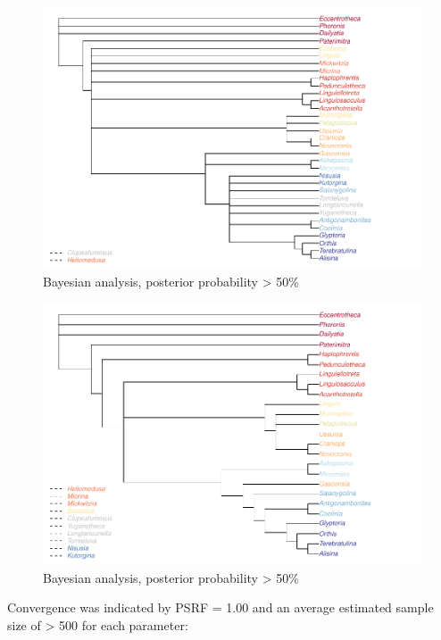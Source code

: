 \documentclass[]{book}
\theoremstyle{definition}
\theoremstyle{definition}
\theoremstyle{definition}
\theoremstyle{remark}
\begin{document}
\begin{figure}
\centering
\includegraphics{Brachiopod_phylogeny_files/figure-latex/unnamed-chunk-11-1.pdf}
\caption{\label{fig:unnamed-chunk-11}Bayesian analysis, posterior
probability \textgreater{} 50\%}
\end{figure}

\begin{figure}
\centering
\includegraphics{Brachiopod_phylogeny_files/figure-latex/unnamed-chunk-12-1.pdf}
\caption{\label{fig:unnamed-chunk-12}Bayesian analysis, posterior
probability \textgreater{} 50\%}
\end{figure}

Convergence was indicated by PSRF = 1.00 and an average estimated sample
size of \textgreater{} 500 for each parameter:
\end{document}
